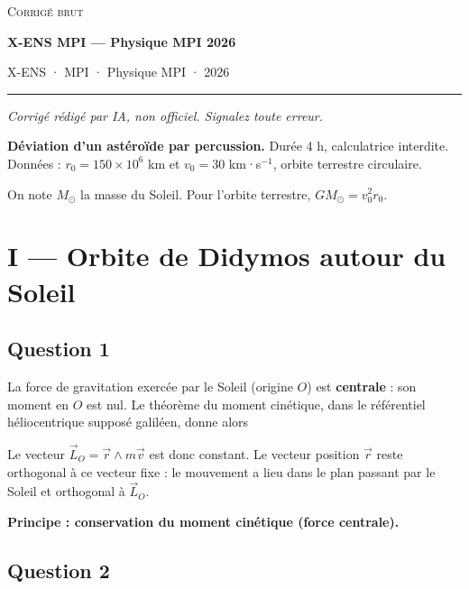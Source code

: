 \documentclass[11pt,a4paper]{article}
\newcommand{\equationajustee}[1]{%
  \sbox{\boiteequation}{$\displaystyle #1$}%
  \ifdim\wd\boiteequation>\linewidth
    \[\resizebox{\linewidth}{!}{\usebox{\boiteequation}}\]%
  \else
    \[#1\]%
  \fi}
\begin{document}
\thispagestyle{plain}
\begin{center}
  {\small\scshape Corrigé brut}\par\smallskip
  {\LARGE\bfseries X-ENS MPI — Physique MPI 2026\par}\medskip
  {\large X-ENS · MPI · Physique MPI · 2026\par}
\end{center}
\vspace{2pt}\hrule\vspace{8pt}

\emph{Corrigé rédigé par IA, non officiel. Signalez toute erreur.}

\textbf{Déviation d'un astéroïde par percussion.} Durée 4 h, calculatrice interdite. Données : \(r_0=150\times10^6\) km et \(v_0=30\) km·s\(^{-1}\), orbite terrestre circulaire.

On note \(M_\odot\) la masse du Soleil. Pour l'orbite terrestre, \(GM_\odot=v_0^2r_0\).

\hypertarget{i-orbite-de-didymos-autour-du-soleil}{%
\section{I --- Orbite de Didymos autour du Soleil}\label{i-orbite-de-didymos-autour-du-soleil}}

\hypertarget{question-1}{%
\subsection{Question 1}\label{question-1}}

La force de gravitation exercée par le Soleil (origine \(O\)) est \textbf{centrale} : son moment en \(O\) est nul. Le théorème du moment cinétique, dans le référentiel héliocentrique supposé galiléen, donne alors

\equationajustee{\frac{\mathrm d\vec L_O}{\mathrm dt}=\vec 0 .}

Le vecteur \(\vec L_O=\vec r\wedge m\vec v\) est donc constant. Le vecteur position \(\vec r\) reste orthogonal à ce vecteur fixe : le mouvement a lieu dans le plan passant par le Soleil et orthogonal à \(\vec L_O\).

\textbf{Principe : conservation du moment cinétique (force centrale).}

\hypertarget{question-2}{%
\subsection{Question 2}\label{question-2}}
\end{document}
